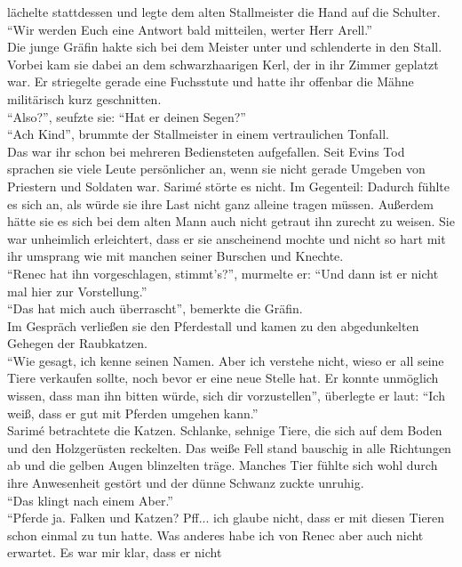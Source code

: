 lächelte stattdessen und legte dem alten Stallmeister die Hand auf die Schulter. ``Wir werden Euch 
eine Antwort bald mitteilen, werter Herr Arell.''\\
Die junge Gräfin hakte sich bei dem Meister unter und schlenderte in den Stall. Vorbei kam sie 
dabei an dem schwarzhaarigen Kerl, der in ihr Zimmer geplatzt war. Er striegelte gerade eine 
Fuchsstute und hatte ihr offenbar die Mähne militärisch kurz geschnitten.\\
``Also?'', seufzte sie: ``Hat er deinen Segen?''\\
``Ach Kind'', brummte der Stallmeister in einem vertraulichen Tonfall.\\
Das war ihr schon bei mehreren Bediensteten aufgefallen. Seit Evins Tod sprachen sie viele Leute 
persönlicher an, wenn sie nicht gerade Umgeben von Priestern und Soldaten war. Sarimé störte es 
nicht. Im Gegenteil: Dadurch fühlte es sich an, als würde sie ihre Last nicht ganz alleine tragen 
müssen. Außerdem hätte sie es sich bei dem alten Mann auch nicht getraut ihn zurecht zu weisen. Sie 
war unheimlich erleichtert, dass er sie anscheinend mochte und nicht so hart mit ihr umsprang wie 
mit manchen seiner Burschen und Knechte.\\
``Renec hat ihn vorgeschlagen, stimmt's?'', murmelte er: ``Und dann ist er nicht mal hier zur
Vorstellung.''\\
``Das hat mich auch überrascht'', bemerkte die Gräfin.\\
Im Gespräch verließen sie den Pferdestall und kamen zu den abgedunkelten Gehegen der Raubkatzen.\\
``Wie gesagt, ich kenne seinen Namen. Aber ich verstehe nicht, wieso er all seine Tiere verkaufen 
sollte, noch bevor er eine neue Stelle hat. Er konnte unmöglich wissen, dass man ihn bitten würde, 
sich dir vorzustellen'', überlegte er laut: ``Ich weiß, dass er gut mit Pferden umgehen kann.''\\
Sarimé betrachtete die Katzen. Schlanke, sehnige Tiere, die sich auf dem Boden und den Holzgerüsten 
reckelten. Das weiße Fell stand bauschig in alle Richtungen ab und die gelben Augen blinzelten 
träge. Manches Tier fühlte sich wohl durch ihre Anwesenheit gestört und der dünne Schwanz zuckte 
unruhig.\\
``Das klingt nach einem Aber.''\\
``Pferde ja. Falken und Katzen? Pff... ich glaube nicht, dass er mit diesen Tieren schon einmal zu 
tun hatte. Was anderes habe ich von Renec aber auch nicht erwartet. Es war mir klar, dass er nicht 
